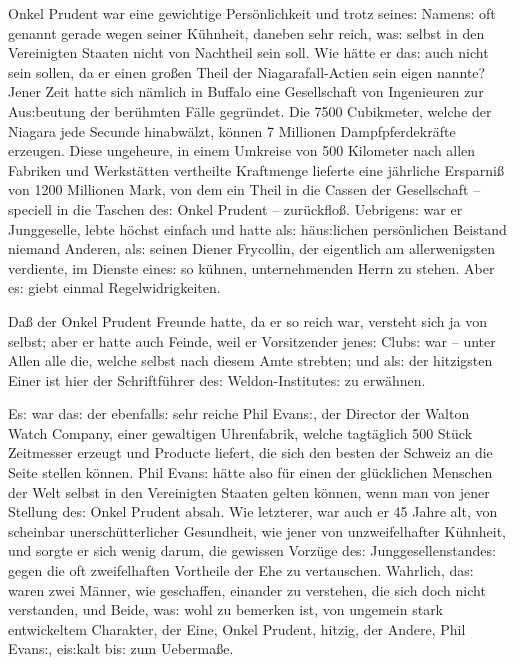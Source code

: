 \documentclass[oneside,12pt]{book}
\newcommand{\s}{s:}
\begin{document}
Onkel Prudent war eine gewichtige Pers\"onlichkeit und trotz
seine{\s} Namen{\s} oft genannt gerade wegen seiner K\"uhnheit,
daneben sehr reich, wa{\s} selbst in den Vereinigten Staaten nicht
von Nachtheil sein soll. Wie h\"atte er da{\s} auch nicht sein
sollen, da er einen gro{\ss}en Theil der Niagarafall-Actien sein
eigen nannte? Jener Zeit hatte sich n\"amlich in Buffalo eine
Gesellschaft von Ingenieuren zur Au{\s}beutung der ber\"uhmten
F\"alle gegr\"undet. Die 7500 Cubikmeter, welche der Niagara jede
Secunde hinabw\"alzt, k\"onnen 7 Millionen Dampfpferdekr\"afte
erzeugen. Diese ungeheure, in einem Umkreise von 500 Kilometer nach
allen Fabriken und Werkst\"atten vertheilte Kraftmenge lieferte eine
j\"ahrliche Ersparni{\ss} von 1200 Millionen Mark, von dem ein Theil
in die Cassen der Gesellschaft -- speciell in die Taschen de{\s}
Onkel Prudent -- zur\"uckflo{\ss}. Uebrigen{\s} war er Junggeselle,
lebte h\"ochst einfach und hatte al{\s} h\"au{\s}lichen
pers\"onlichen Beistand niemand Anderen, al{\s} seinen Diener
Frycollin, der eigentlich am allerwenigsten verdiente, im Dienste
eine{\s} so k\"uhnen, unternehmenden Herrn zu stehen. Aber e{\s}
giebt einmal Regelwidrigkeiten.

Da{\ss} der Onkel Prudent Freunde hatte, da er so reich war, versteht
sich ja von selbst; aber er hatte auch Feinde, weil er Vorsitzender
jene{\s} Club{\s} war -- unter Allen alle die, welche selbst nach
diesem Amte strebten; und al{\s} der hitzigsten Einer ist hier der
Schriftf\"uhrer de{\s} Weldon-Institute{\s} zu erw\"ahnen.

E{\s} war da{\s} der ebenfall{\s} sehr reiche Phil Evan{\s}, der
Director der Walton Watch Company, einer gewaltigen Uhrenfabrik,
welche tagt\"aglich 500 St\"uck Zeitmesser erzeugt und Producte
liefert, die sich den besten der Schweiz an die Seite stellen
k\"onnen. Phil Evan{\s} h\"atte also f\"ur einen der gl\"ucklichen
Menschen der Welt selbst in den Vereinigten Staaten gelten k\"onnen,
wenn man von jener Stellung de{\s} Onkel Prudent absah. Wie
letzterer, war auch er 45 Jahre alt, von scheinbar
unersch\"utterlicher Gesundheit, wie jener von unzweifelhafter
K\"uhnheit, und sorgte er sich wenig darum, die gewissen Vorz\"uge
de{\s} Junggesellenstande{\s} gegen die oft zweifelhaften Vortheile
der Ehe zu vertauschen. Wahrlich, da{\s} waren zwei M\"anner, wie
geschaffen, einander zu verstehen, die sich doch nicht verstanden,
und Beide, wa{\s} wohl zu bemerken ist, von ungemein stark
entwickeltem Charakter, der Eine, Onkel Prudent, hitzig, der Andere,
Phil Evan{\s}, ei{\s}kalt bi{\s} zum Ueberma{\ss}e.
\end{document}
